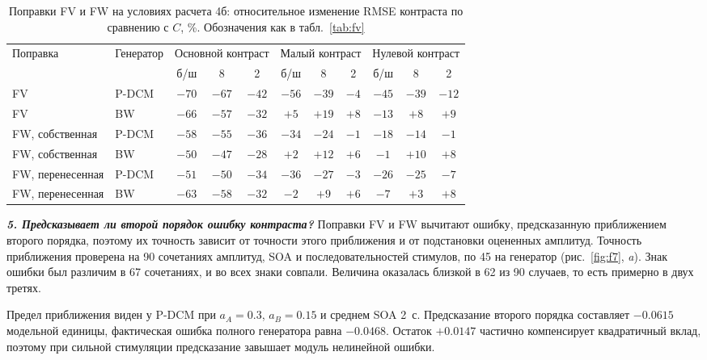 \begin{table}[h]
\captionsetup{justification=raggedright}
\caption{Поправки FV и FW на условиях расчета 4б: относительное изменение RMSE контраста по сравнению с $C$, \%. Обозначения как в табл.~\ref{tab:fv}}
\label{tab:fw}
\centering
\footnotesize
\setlength{\tabcolsep}{3pt}
\begin{tabular}{llccccccccc}
\hline
\multirow{2}{*}{Поправка} & \multirow{2}{*}{Генератор} & \multicolumn{3}{c}{Основной контраст} & \multicolumn{3}{c}{Малый контраст} & \multicolumn{3}{c}{Нулевой контраст}\\
\cline{3-11}
 & & б/ш & 8 & 2 & б/ш & 8 & 2 & б/ш & 8 & 2\\
\hline
FV & P-DCM & $-70$ & $-67$ & $-42$ & $-56$ & $-39$ & $-4$ & $-45$ & $-39$ & $-12$\\
FV & BW & $-66$ & $-57$ & $-32$ & $+5$ & $+19$ & $+8$ & $-13$ & $+8$ & $+9$\\
FW, собственная & P-DCM & $-58$ & $-55$ & $-36$ & $-34$ & $-24$ & $-1$ & $-18$ & $-14$ & $-1$\\
FW, собственная & BW & $-50$ & $-47$ & $-28$ & $+2$ & $+12$ & $+6$ & $-1$ & $+10$ & $+8$\\
FW, перенесенная & P-DCM & $-51$ & $-50$ & $-34$ & $-36$ & $-27$ & $-3$ & $-26$ & $-25$ & $-7$\\
FW, перенесенная & BW & $-63$ & $-58$ & $-32$ & $-2$ & $+9$ & $+6$ & $-7$ & $+3$ & $+8$\\
\hline
\end{tabular}
\end{table}

\FloatBarrier

\textbf{\textit{5. Предсказывает ли второй порядок ошибку контраста?}} Поправки FV и FW вычитают ошибку, предсказанную приближением второго порядка, поэтому их точность зависит от точности этого приближения и от подстановки оцененных амплитуд. Точность приближения проверена на 90 сочетаниях амплитуд, SOA и последовательностей стимулов, по 45 на генератор (рис.~\ref{fig:f7}, \textit{a}). Знак ошибки был различим в 67 сочетаниях, и во всех знаки совпали. Величина оказалась близкой в 62 из 90 случаев, то есть примерно в двух третях.

Предел приближения виден у P-DCM при $a_A=0.3$, $a_B=0.15$ и среднем SOA 2~с. Предсказание второго порядка составляет $-0.0615$ модельной единицы, фактическая ошибка полного генератора равна $-0.0468$. Остаток $+0.0147$ частично компенсирует квадратичный вклад, поэтому при сильной стимуляции предсказание завышает модуль нелинейной ошибки.

